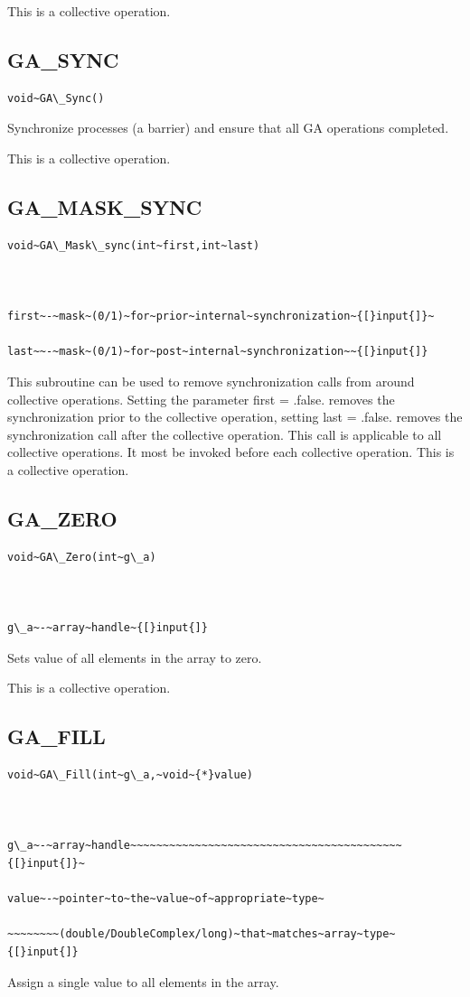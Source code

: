 This is a collective operation. 


\subsection*{\label{sub:GA_SYNC}GA\_SYNC}
\begin{verbatim}
void~GA\_Sync()
\end{verbatim}
Synchronize processes (a barrier) and ensure that all GA operations
completed.

This is a collective operation.


\subsection*{GA\_MASK\_SYNC}
\begin{verbatim}
void~GA\_Mask\_sync(int~first,int~last)



first~-~mask~(0/1)~for~prior~internal~synchronization~{[}input{]}~

last~~-~mask~(0/1)~for~post~internal~synchronization~~{[}input{]}
\end{verbatim}
This subroutine can be used to remove synchronization calls from around
collective operations. Setting the parameter first = .false. removes
the synchronization prior to the collective operation, setting last
= .false. removes the synchronization call after the collective operation.
This call is applicable to all collective operations. It most be invoked
before each collective operation. This is a collective operation. 


\subsection*{\label{sub:GA_ZERO}GA\_ZERO}
\begin{verbatim}
void~GA\_Zero(int~g\_a)



g\_a~-~array~handle~{[}input{]}
\end{verbatim}
Sets value of all elements in the array to zero.

This is a collective operation. 


\subsection*{\label{sub:GA_FILL}GA\_FILL}
\begin{verbatim}
void~GA\_Fill(int~g\_a,~void~{*}value)



g\_a~-~array~handle~~~~~~~~~~~~~~~~~~~~~~~~~~~~~~~~~~~~~~~~~~{[}input{]}~

value~-~pointer~to~the~value~of~appropriate~type~

~~~~~~~~(double/DoubleComplex/long)~that~matches~array~type~{[}input{]}
\end{verbatim}
Assign a single value to all elements in the array.

